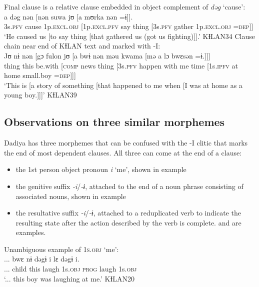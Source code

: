 \documentclass[output=paper]{langscibook}
\begin{document}
\ea Final clause is a relative clause embedded in object complement of \textit{dəg} `cause':
\label{ex:dettweiler:KƗLAN34} \\
\gll a dəg nən [nən suwa jʊ [a mʊrka nən =ɨ]]. \\
3s.\textsc{pfv} cause 1p.\textsc{excl}.\textsc{obj} [1p.\textsc{excl}.\textsc{pfv} say thing [3s.\textsc{pfv} gather 1p.\textsc{excl}.\textsc{obj} =\textsc{dep}]] \\
\glt `He caused us [to say thing [that gathered us (got us fighting)]].' KƗLAN34
\ex Clause chain near end of KƗLAN text and marked with -I:
\label{ex:dettweiler:KƗLAN39} \\
\gll Jʊ nɨ nən [gɔ fulon jʊ [a bwɨ nən məu kwama [mə a lɔ bwɛsən =ɨ.]]] \\
thing this be.with [\textsc{comp} news thing [3s.\textsc{pfv} happen with me time [1s.\textsc{ipfv} at home small.boy =\textsc{dep}]]] \\
\glt `This is [a story of something [that happened to me when [I was at home as a young boy.]]]' KƗLAN39
\z

\subsection{Observations on three similar morphemes}\largerpage

Dadiya has three morphemes that can be confused with the -I clitic that marks the end of most dependent clauses. All three can come at the end of a clause:

\begin{itemize}
    \item the 1st person object pronoun \textit{i} `me', shown in example 
    \item the genitive suffix \textit{-i}/\textit{-ɨ}, attached to the end of a noun phrase consisting of associated nouns, shown in example 
    \item the resultative suffix \textit{-i}/\textit{-ɨ}, attached to a reduplicated verb to indicate the resulting state after the action described by the verb is complete.  and  are examples.
\end{itemize}

\ea Unambiguous example of \textsc{1s.obj} `me':
\label{ex:dettweiler:KƗLAN20} \\
\gll ... bwɛ nɨ dəgɨ i lɛ dəgɨ i. \\
... child this laugh 1s.\textsc{obj} \textsc{prog} laugh 1s.\textsc{obj} \\
\glt `... this boy was laughing at me.' KƗLAN20
\z
\end{document}
